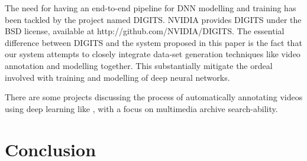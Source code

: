 \documentclass[conference]{IEEEtran}
\begin{document}
The need for having an end-to-end pipeline for DNN modelling and training has been tackled by the project named DIGITS. NVIDIA provides DIGITS under the BSD license, available at http://github.com/NVIDIA/DIGITS. The essential difference between DIGITS and the system proposed in this paper is the fact that our system attempts to closely integrate data-set generation techniques like video annotation and modelling together. This substantially mitigate the ordeal involved with training and modelling of deep neural networks.

There are some projects discussing the process of automatically annotating videos using deep learning like \cite{baptist2016automatedendtoend}, with a focus on multimedia archive search-ability. 

\section{Conclusion}\label{sec.conclusion}













%
%
%
\end{document}
